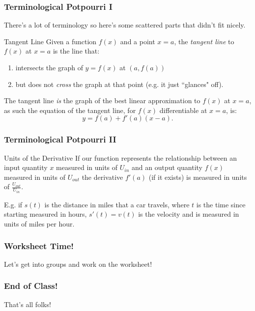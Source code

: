 \documentclass{ltx-talk}
\begin{document}
\begin{frame}
  \frametitle{Terminological Potpourri I}

  There's a lot of terminology so here's some scattered parts that didn't fit nicely. \pause

  \begin{block}
    {Tangent Line}
    Given a function $f(x)$ and a point $x = a$, \pause 
    the \textit{tangent line} to $f(x)$ at $x = a$ is the line that: \pause
    \begin{enumerate}
      \item intersects the graph of $y = f(x)$ at $(a, f(a))$ \pause
      \item but does not \textit{cross} the graph at that point \pause (e.g. it just ``glances" off). \pause
    \end{enumerate}

    The tangent line \textit{is} the graph of the best linear approximation to $f(x)$ at $x = a$, \pause
    as such the equation of the tangent line, for $f(x)$ differentiable at $x = a$, is: \pause
    \begin{equation}
      y = f(a) + f'(a)(x - a).
    \end{equation} \pause
  \end{block}
\end{frame}
\begin{frame}
  \frametitle{Terminological Potpourri II}
  \begin{block}{Units of the Derivative}
    If our function represents the relationship between \pause
    an input quantity $x$ measured in units of $U_{in}$ \pause
    and an output quantity $f(x)$ measured in units of $U_{out}$ \pause
    the derivative $f'(a)$ (if it exists) \pause
    is measured in units of $\frac{U_{out}}{U_{in}}$. \pause
  \end{block}

  E.g. if $s(t)$ is the distance in miles that a car travels, where $t$ is the time since starting measured in hours, \pause
  $s'(t) = v(t)$ is the velocity and is measured in units of miles per hour.
\end{frame}

\begin{frame}
  \frametitle{Worksheet Time!}
  Let's get into groups and work on the worksheet!
\end{frame}

\begin{frame}
  \frametitle{End of Class!}
  That's all folks!
\end{frame}
\end{document}
